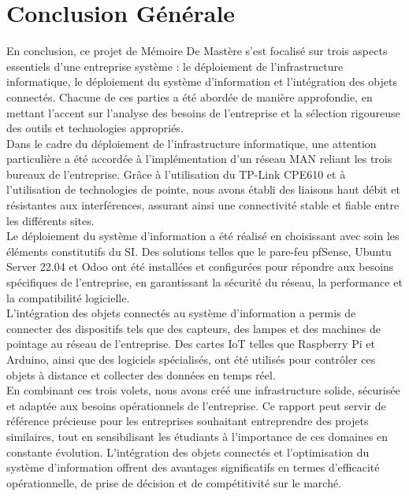 \chapter{Conclusion Générale }



En conclusion, ce projet de Mémoire De Mastère s'est focalisé sur trois aspects essentiels d'une entreprise système : le déploiement de l'infrastructure informatique, le déploiement du système d'information et l'intégration des objets connectés. Chacune de ces parties a été abordée de manière approfondie, en mettant l'accent sur l'analyse des besoins de l'entreprise et la sélection rigoureuse des outils et technologies appropriés. \\

Dans le cadre du déploiement de l'infrastructure informatique, une attention particulière a été accordée à l'implémentation d'un réseau MAN reliant les trois bureaux de l'entreprise. Grâce à l'utilisation du TP-Link CPE610 et à l'utilisation de technologies de pointe, nous avons établi des liaisons haut débit et résistantes aux interférences, assurant ainsi une connectivité stable et fiable entre les différents sites. \\

Le déploiement du système d'information a été réalisé en choisissant avec soin les éléments constitutifs du SI. Des solutions telles que le pare-feu pfSense, Ubuntu Server 22.04 et Odoo ont été installées et configurées pour répondre aux besoins spécifiques de l'entreprise, en garantissant la sécurité du réseau, la performance et la compatibilité logicielle. \\

L'intégration des objets connectés au système d'information a permis de connecter des dispositifs tels que des capteurs, des lampes et des machines de pointage au réseau de l'entreprise. Des cartes IoT telles que Raspberry Pi et Arduino, ainsi que des logiciels spécialisés, ont été utilisés pour contrôler ces objets à distance et collecter des données en temps réel. \\

En combinant ces trois volets, nous avons créé une infrastructure solide, sécurisée et adaptée aux besoins opérationnels de l'entreprise. Ce rapport peut servir de référence précieuse pour les entreprises souhaitant entreprendre des projets similaires, tout en sensibilisant les étudiants à l'importance de ces domaines en constante évolution. L'intégration des objets connectés et l'optimisation du système d'information offrent des avantages significatifs en termes d'efficacité opérationnelle, de prise de décision et de compétitivité sur le marché. \\